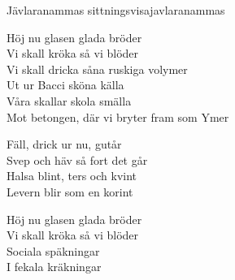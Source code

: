 \begin{song}{Jävlaranammas sittningsvisa}{javlaranammas}
\begin{vers}
Höj nu glasen glada bröder\\
Vi skall kröka så vi blöder\\
Vi skall dricka såna ruskiga volymer\\
Ut ur Bacci sköna källa\\
Våra skallar skola smälla\\
Mot betongen, där vi bryter fram som Ymer\\
\end{vers}
\begin{vers}
Fäll, drick ur nu, gutår\\
Svep och häv så fort det går\\
Halsa blint, ters och kvint\\
Levern blir som en korint\\
\end{vers}
\begin{vers}
Höj nu glasen glada bröder\\
Vi skall kröka så vi blöder\\
Sociala späkningar\\
I fekala kräkningar\\
\end{vers}
\end{song}